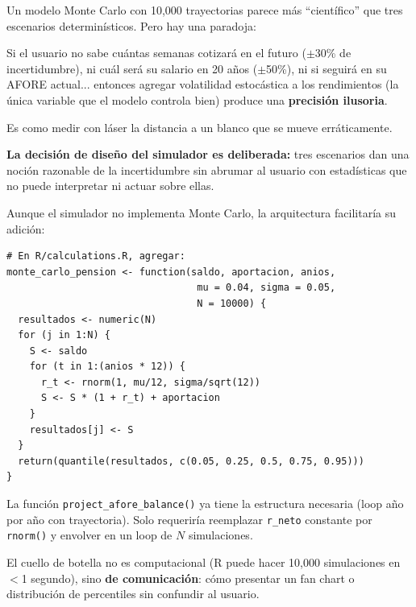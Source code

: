 \documentclass[11pt,a4paper]{report}
\begin{document}
\begin{tcolorbox}[colback=green!5!white, colframe=green!50!black, title=\textbf{Intuici\'on: La Paradoja de la Precisi\'on}]
Un modelo Monte Carlo con 10,000 trayectorias parece m\'as ``cient\'ifico'' que tres escenarios determin\'isticos. Pero hay una paradoja:

Si el usuario no sabe cu\'antas semanas cotizar\'a en el futuro ($\pm$30\% de incertidumbre), ni cu\'al ser\'a su salario en 20 a\~nos ($\pm$50\%), ni si seguir\'a en su AFORE actual... entonces agregar volatilidad estoc\'astica a los rendimientos (la \'unica variable que el modelo controla bien) produce una \textbf{precisi\'on ilusoria}.

Es como medir con l\'aser la distancia a un blanco que se mueve err\'aticamente.

\textbf{La decisi\'on de dise\~no del simulador es deliberada:} tres escenarios dan una noci\'on razonable de la incertidumbre sin abrumar al usuario con estad\'isticas que no puede interpretar ni actuar sobre ellas.
\end{tcolorbox}

\begin{tcolorbox}[colback=orange!5!white, colframe=orange!75!black, title=\textbf{Aplicaci\'on en C\'odigo: Arquitectura Lista para Extensi\'on}]
Aunque el simulador no implementa Monte Carlo, la arquitectura facilitar\'ia su adici\'on:

\begin{lstlisting}[caption={Pseudo-c\'odigo para extensi\'on Monte Carlo}]
# En R/calculations.R, agregar:
monte_carlo_pension <- function(saldo, aportacion, anios,
                                 mu = 0.04, sigma = 0.05,
                                 N = 10000) {
  resultados <- numeric(N)
  for (j in 1:N) {
    S <- saldo
    for (t in 1:(anios * 12)) {
      r_t <- rnorm(1, mu/12, sigma/sqrt(12))
      S <- S * (1 + r_t) + aportacion
    }
    resultados[j] <- S
  }
  return(quantile(resultados, c(0.05, 0.25, 0.5, 0.75, 0.95)))
}
\end{lstlisting}

La funci\'on \texttt{project\_afore\_balance()} ya tiene la estructura necesaria (loop a\~no por a\~no con trayectoria). Solo requerir\'ia reemplazar \texttt{r\_neto} constante por \texttt{rnorm()} y envolver en un loop de $N$ simulaciones.

El cuello de botella no es computacional (R puede hacer 10,000 simulaciones en $<$1 segundo), sino \textbf{de comunicaci\'on}: c\'omo presentar un fan chart o distribuci\'on de percentiles sin confundir al usuario.
\end{tcolorbox}
\end{document}
